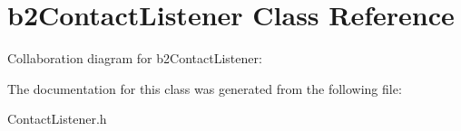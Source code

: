 \hypertarget{classb2_contact_listener}{}\section{b2\+Contact\+Listener Class Reference}
\label{classb2_contact_listener}


Collaboration diagram for b2\+Contact\+Listener\+:


The documentation for this class was generated from the following file\+:\begin{DoxyCompactItemize}
\item 
Contact\+Listener.\+h\end{DoxyCompactItemize}
